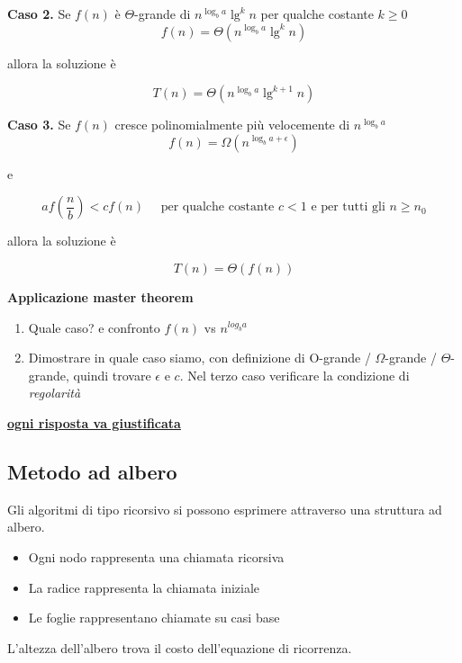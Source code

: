 \documentclass{article}
\begin{document}
\vspace{.7cm}

\textbf{Caso 2.}
Se \(f(n)\) è \(\Theta\)-grande di \(n^{\log_b a}\lg^k n\) per qualche costante \(k \geq 0\)
\[f(n) = \Theta\left(n^{\log_b a}\lg^k n\right)\]
\begin{center}allora la soluzione è\end{center}
\[T(n) = \Theta\left(n^{\log_b a} \lg^{k+1} n\right)\]

\vspace{.7cm}

\textbf{Caso 3.}
Se \(f(n)\) cresce polinomialmente più velocemente di \(n^{\log_b a}\)
\[f(n) = \Omega\left(n^{\log_b a + \epsilon}\right)\]
\begin{center}e\end{center}
\[a f(\frac{n}{b}) < c f(n) \quad \text{ per qualche costante } c < 1 \text{ e per tutti gli } n \geq n_0\]
\begin{center}allora la soluzione è\end{center}
\[T(n) = \Theta\left(f(n)\right)\]

\vspace{1.5cm}

\noindent\textbf{Applicazione master theorem}
\begin{enumerate}
    \item Quale caso? e confronto  \(f(n)\) vs \(n^{log_b a}\)
    \item Dimostrare in quale caso siamo, con definizione di O-grande / \(\Omega\)-grande / \(\Theta\)-grande, quindi trovare \(\epsilon\) e \(c\). Nel terzo caso verificare la condizione di \emph{regolarità}
\end{enumerate}
\underline{\textbf{ogni risposta va giustificata}}

\subsection{Metodo ad albero}
Gli algoritmi di tipo ricorsivo si possono esprimere attraverso una struttura ad albero.
\begin{itemize}
    \item Ogni nodo rappresenta una chiamata ricorsiva
    \item La radice rappresenta la chiamata iniziale
    \item Le foglie rappresentano chiamate su casi base
\end{itemize}
L'altezza dell'albero trova il costo dell'equazione di ricorrenza.
\end{document}
